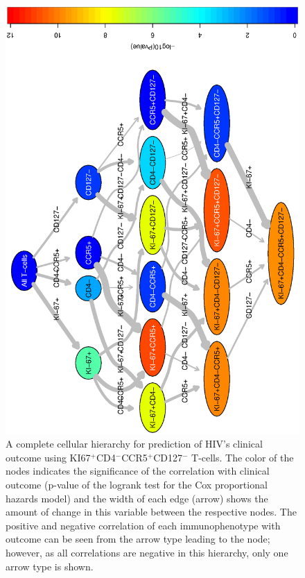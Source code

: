   \begin{landscape}
    \begin{figure}[ht]
      \begin{center}
        \includegraphics[width=\textwidth, angle=270]{figs/rchy/figs/HIVClinicalOutcomeComplete}
      \end{center}
      \caption{A complete cellular hierarchy for prediction of HIV's clinical outcome using KI67$^+$CD4$^-$CCR5$^+$CD127$^-$ T-cells. 
      The color of the nodes indicates the significance of the correlation with clinical outcome (p-value of the logrank test for the Cox proportional hazards model) and the width of each edge (arrow) shows the amount of change in this variable between the respective nodes.
        The positive and negative correlation of each immunophenotype with outcome can be seen from the arrow type leading to the node; however, as all correlations are negative in this hierarchy, only one arrow type is shown. 
      }
      \label{r1:HIVClinicalOutcomeComplete}
    \end{figure}
  \end{landscape}

